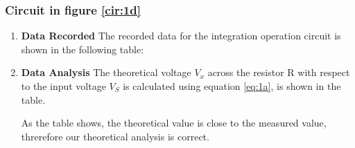     \subsubsection{Circuit in figure \ref{cir:1d}}
        \begin{enumerate}[I]
            \item \textbf{Data Recorded}\newline
                The recorded data for the integration operation circuit is shown in the following table:
                \begin{table}[H]
                    \addtolength{\leftskip}{-2cm}
                    \addtolength{\rightskip}{-2cm}
                    \centering
                    \caption{Recorded Data for Circuit \ref{cir:1d}(Unit: V)}
                    \label{tab:1d}
                \end{table}
            \item \textbf{Data Analysis}\newline
                The theoretical voltage $V_x$ across the resistor R with respect to the input voltage $V_S$ is calculated using equation \ref{eq:1a}, is shown in the table.\par
                
                As the table shows, the theoretical value is close to the measured value, threrefore our theoretical analysis is correct.
        \end{enumerate}

